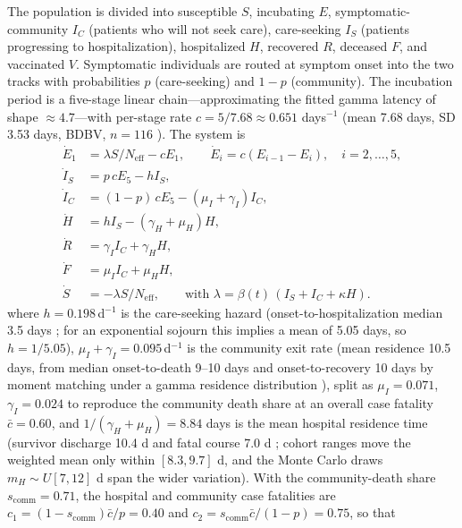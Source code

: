 \documentclass[10pt]{plos}
\begin{document}
The population is divided into susceptible $S$, incubating $E$,
symptomatic-community $I_C$ (patients who will not seek care),
care-seeking $I_S$ (patients progressing to hospitalization), hospitalized
$H$, recovered $R$, deceased $F$, and vaccinated $V$. Symptomatic
individuals are routed at symptom onset into the two tracks with
probabilities $p$ (care-seeking) and $1-p$ (community). The incubation
period is a five-stage linear chain---approximating the fitted gamma
latency of shape $\approx4.7$---with per-stage rate $c=5/7.68\approx0.651$
days$^{-1}$ (mean 7.68 days, SD 3.53 days, BDBV, $n=116$
\cite{Wamala2010}). The system is
\begin{subequations}\label{eq:model}
\begin{align}
\dot E_1 &= \lambda S/N_{\mathrm{eff}} - cE_1, \qquad
\dot E_i = c(E_{i-1}-E_i),\quad i=2,\dots,5,\\
\dot I_S &= p\,cE_5 - h I_S,\\
\dot I_C &= (1-p)\,cE_5 - (\mu_I+\gamma_I) I_C,\\
\dot H   &= h I_S - (\gamma_H+\mu_H) H,\\
\dot R   &= \gamma_I I_C + \gamma_H H,\\
\dot F   &= \mu_I I_C + \mu_H H,\\
\dot S   &= -\lambda S/N_{\mathrm{eff}},
\qquad\text{with }\lambda=\beta(t)\,(I_S+I_C+\kappa H).
\end{align}
\end{subequations}
where $h=0.198\,$d$^{-1}$ is the care-seeking hazard (onset-to-hospitalization
median 3.5 days \cite{VanKerkhove2015}; for an exponential sojourn this
implies a mean of 5.05 days, so $h=1/5.05$), $\mu_I+\gamma_I=0.095\,$d$^{-1}$
is the community exit rate (mean residence 10.5 days, from median
onset-to-death 9--10 days and onset-to-recovery 10 days
\cite{VanKerkhove2015} by moment matching under a gamma residence
distribution \cite{Lloyd2001,Wallinga2007}), split as $\mu_I=0.071$,
$\gamma_I=0.024$ to reproduce the community death share at an overall
case fatality $\bar c=0.60$, and $1/(\gamma_H+\mu_H)=8.84$ days is the mean
hospital residence time (survivor discharge 10.4 d and fatal course
7.0 d \cite{WHOEbolaResponse2014,Legrand2007}; cohort ranges move the
weighted mean only within $[8.3,9.7]$ d, and the Monte Carlo draws
$m_H\sim U[7,12]$ d span the wider variation). With the community-death
share $s_{\mathrm{comm}}=0.71$, the hospital and community case
fatalities are $c_1=(1-s_{\mathrm{comm}})\bar c/p=0.40$ and
$c_2=s_{\mathrm{comm}}\bar c/(1-p)=0.75$, so that
\end{document}
